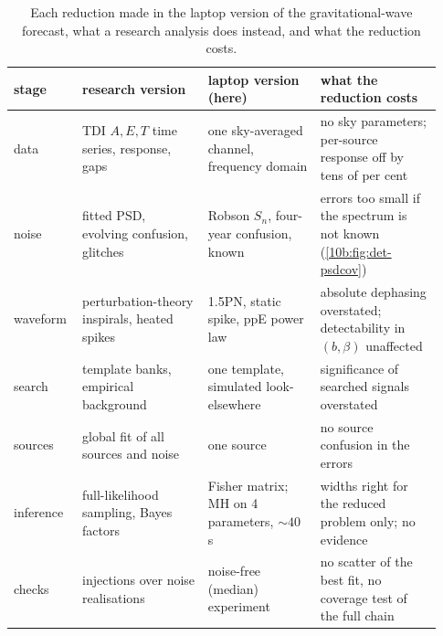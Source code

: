 \begin{table}[htbp]
\centering
\small
\renewcommand{\arraystretch}{1.2}
\begin{tabular}{@{}p{0.13\linewidth}p{0.28\linewidth}p{0.25\linewidth}p{0.27\linewidth}@{}}
\toprule
stage & research version & laptop version (here) & what the reduction costs\\\midrule
data & TDI $A,E,T$ time series, response, gaps & one sky-averaged channel, frequency domain & no sky parameters; per-source response off by tens of per cent\\
noise & fitted PSD, evolving confusion, glitches & Robson $S_n$, four-year confusion, known & errors too small if the spectrum is not known (\cref{10b:fig:det-psdcov})\\
waveform & perturbation-theory inspirals, heated spikes & 1.5PN, static spike, ppE power law & absolute dephasing overstated; detectability in $(b,\beta)$ unaffected\\
search & template banks, empirical background & one template, simulated look-elsewhere & significance of searched signals overstated\\
sources & global fit of all sources and noise & one source & no source confusion in the errors\\
inference & full-likelihood sampling, Bayes factors & Fisher matrix; MH on 4 parameters, $\sim40$\,s & widths right for the reduced problem only; no evidence\\
checks & injections over noise realisations & noise-free (median) experiment & no scatter of the best fit, no coverage test of the full chain\\
\bottomrule
\end{tabular}
\caption{Each reduction made in the laptop version of the gravitational-wave forecast, what a research analysis does
instead, and what the reduction costs.}
\label{10b:tab:laptop}
\end{table}

